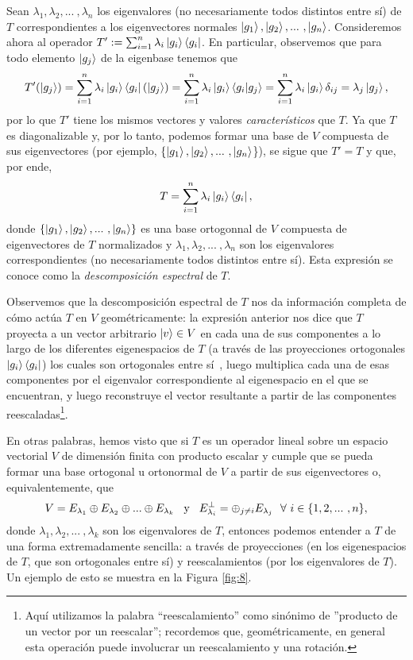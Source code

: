 \documentclass[12pt,libertine]{book}
\begin{document}
\vspace{3mm}
Sean $\lambda_1,\lambda_2,... \ ,\lambda_n$ los eigenvalores (no necesariamente todos distintos entre sí) de $T$ correspondientes a los eigenvectores normales $\ket{g_1},\ket{g_2},... \ ,\ket{g_n}$. Consideremos ahora al operador $T':=\sum_{i=1}^n \lambda_i \ket{g_i}\bra{g_i}$. En particular, observemos que para todo elemento $\ket{g_j}$ de la eigenbase tenemos que \[
    T'(\ket{g_j})=\sum_{i=1}^n \lambda_i \ket{g_i}\bra{g_i}(\ket{g_j})=\sum_{i=1}^n \lambda_i \ket{g_i}\braket{g_i|g_j}=\sum_{i=1}^n \lambda_i \ket{g_i}\delta_{ij}=\lambda_j \ket{g_j},
\] por lo que $T'$ tiene los mismos vectores y valores \emph{característicos} que $T$.  Ya que $T$ es diagonalizable y, por lo tanto, podemos formar una base de $V$ compuesta de sus eigenvectores (por ejemplo, $\{\ket{g_1},\ket{g_2},... \ ,\ket{g_n}$\}), se sigue que $T'=T$ y que, por ende, \[
T = \sum_{i=1}^n \lambda_i \ket{g_i}\bra{g_i},
\] donde $\{\ket{g_1},\ket{g_2},... \ ,\ket{g_n}\}$ es una base ortogonnal de $V$ compuesta de eigenvectores de $T$ normalizados y $\lambda_1,\lambda_2,... \ ,\lambda_n$ son los eigenvalores correspondientes (no necesariamente todos distintos entre sí). Esta expresión se conoce como la \emph{descomposición espectral} de $T$.

\vspace{3mm}
Observemos que la descomposición espectral de $T$ nos da información completa de cómo actúa $T$ en $V$ geométricamente: la expresión anterior nos dice que $T$ proyecta a un vector arbitrario $\ket{v}\in V$ en cada una de sus componentes a lo largo de los diferentes eigenespacios de $T$ (a través de las proyecciones ortogonales $\ket{g_i}\bra{g_i}$) \textemdash los cuales son ortogonales entre sí\textemdash \ , luego multiplica cada una de esas componentes por el eigenvalor correspondiente al eigenespacio en el que se encuentran, y luego reconstruye el vector resultante a partir de las componentes reescaladas\footnote{Aquí utilizamos la palabra ``reescalamiento'' como sinónimo de ''producto de un vector por un reescalar''; recordemos que, geométricamente, en general esta operación puede involucrar un reescalamiento y una rotación.}.

\vspace{3mm}
En otras palabras, hemos visto que si $T$ es un operador lineal sobre un espacio vectorial $V$ de dimensión finita con producto escalar y cumple que se pueda formar una base ortogonal u ortonormal de $V$ a partir de sus eigenvectores o, equivalentemente, que $$V=E_{\lambda_1}\oplus E_{\lambda_2}\oplus...\oplus E_{\lambda_k}\hspace{3mm}\text{y}\hspace{3mm}E_{\lambda_i}^\perp=\oplus_{j\neq i}E_{\lambda_j} \ \ \forall \ i\in \{1,2,... \ ,n\},$$ donde $\lambda_1, \lambda_2, ... \ , \lambda_k$ son los eigenvalores de $T$, entonces podemos entender a $T$ de una forma extremadamente sencilla: a través de proyecciones (en los eigenespacios de $T$, que son ortogonales entre sí) y reescalamientos (por los eigenvalores de $T$). Un ejemplo de esto se muestra en la Figura \ref{fig:8}.
\end{document}
